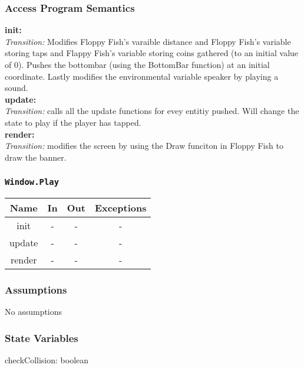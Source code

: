 \documentclass[11pt, oneside]{article}   	%
\begin{document}
\subsubsection*{Access Program Semantics} 
 \textbf{init:}  \\
 \textit{Transition:} Modifies Floppy Fish's varaible distance and Floppy Fish's variable storing taps and Flappy Fish's variable storing coins gathered (to an initial value of 0). Pushes the bottombar (using the BottomBar function) at an initial coordinate. Lastly modifies the environmental variable speaker by playing a sound.\\
 \textbf{update:}  \\
 \textit{Transition:} calls all the update functions for evey entitiy pushed. Will change the state to play if the player has tapped.\\
 \textbf{render:}  \\
 \textit{Transition:} modifies the screen by using the Draw funciton in Floppy Fish to draw the banner.\\


\subsubsection*{\texttt{Window.Play}}



\begin{center}
\begin{tabular}{ |c|c|c|c| } 
 \hline
 Name & In & Out & Exceptions \\ 
 \hline \hline
 init & - & - & - \\ 
 update & - & - & - \\ 
 render & - & - & - \\ 

 \hline
\end{tabular}
\end{center}

\subsubsection*{Assumptions}
No assumptions

\subsubsection*{State Variables}
checkCollision: boolean\\
\end{document}
